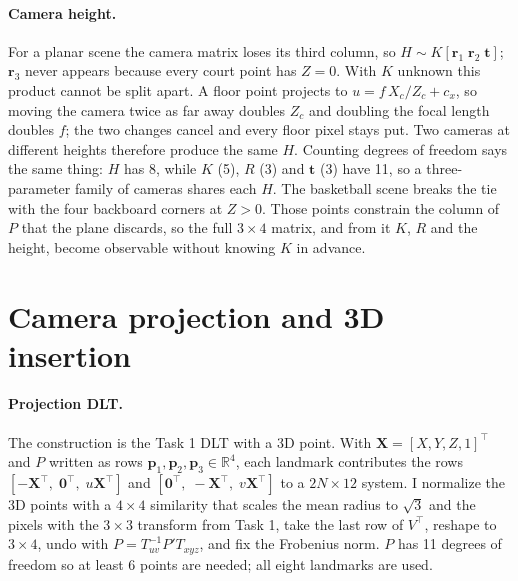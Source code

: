 \documentclass[11pt]{article}
\begin{document}
\paragraph{Camera height.} For a planar scene the camera matrix loses its third column, so
$H\sim K[\mathbf r_1\;\mathbf r_2\;\mathbf t]$; $\mathbf r_3$ never appears
because every court point has $Z=0$. With $K$ unknown this product cannot be
split apart. A floor point projects to $u=f\,X_c/Z_c+c_x$, so moving the camera
twice as far away doubles $Z_c$ and doubling the focal length doubles $f$; the
two changes cancel and every floor pixel stays put. Two cameras at different
heights therefore produce the same $H$. Counting degrees of freedom says the
same thing: $H$ has 8, while $K$ (5), $R$ (3) and $\mathbf t$ (3) have 11, so a
three-parameter family of cameras shares each $H$. The basketball scene breaks
the tie with the four backboard corners at $Z>0$. Those points constrain the
column of $P$ that the plane discards, so the full $3\times4$ matrix, and from
it $K$, $R$ and the height, become observable without knowing $K$ in advance.

\section{Camera projection and 3D insertion}

\paragraph{Projection DLT.} The construction is the Task 1 DLT with a 3D point. With
$\mathbf X=[X,Y,Z,1]^\top$ and $P$ written as rows $\mathbf p_1,\mathbf p_2,\mathbf p_3\in\mathbb R^4$,
each landmark contributes the rows
$[-\mathbf X^\top,\;\mathbf 0^\top,\;u\mathbf X^\top]$ and
$[\mathbf 0^\top,\;-\mathbf X^\top,\;v\mathbf X^\top]$ to a $2N\times12$ system.
I normalize the 3D points with a $4\times4$ similarity that scales the mean
radius to $\sqrt3$ and the pixels with the $3\times3$ transform from Task 1,
take the last row of $V^\top$, reshape to $3\times4$, undo with
$P=T_{uv}^{-1}P'T_{xyz}$, and fix the Frobenius norm. $P$ has 11 degrees of
freedom so at least 6 points are needed; all eight landmarks are used.
\end{document}
